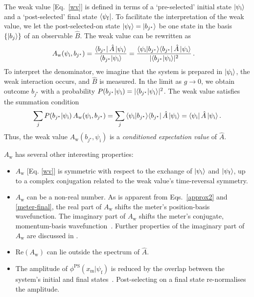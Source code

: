 \documentclass[%
 reprint,
superscriptaddress,
nofootinbib,
bibnotes,
 amsmath,amssymb,
 aps,
]{revtex4-1}
\theoremstyle{plain}
\begin{document}
The weak value [Eq.~\eqref{wv}] is defined in terms of a `pre-selected' initial state $\ket{\psi_{\mathrm{i}}}$ and a `post-selected' final state $\bra{\psi_{\mathrm{f}}}$. 
To facilitate the interpretation of the weak value, we let the post-selected-on state $\ket{\psi_{\mathrm{f}}} = \ket{b_{j^{\star}}}$ be one state in the basis $\{\ket{b_j}\}$ of an observable $\hat{B}$. The weak value can  be rewritten as
\begin{align}
    \label{eq_weakhelp1}
    A_{\mathrm{w}}(\psi_{\mathrm{i}},b_{j^{\star}}) &= \frac{\bra{b_{j^{\star}}}\hat{A}\ket{\psi_{\mathrm{i}}}}{\braket{b_{j^{\star}}|\psi_{\mathrm{i}}}} = \frac{\braket{\psi_{\mathrm{i}}|b_{j^{\star}}}\!\bra{b_{j^{\star}}}\hat{A}\ket{\psi_{\mathrm{i}}}}{|\!\braket{b_{j^{\star}}|\psi_{\mathrm{i}}}\!|^2} \, .
\end{align}
To interpret the denominator, we imagine that the system is prepared in $\ket{\psi_{\mathrm{i}}}$, the weak interaction occurs, and $\hat{B}$ is measured. In the limit as $g \rightarrow 0$, we obtain outcome $b_{j^{\star}}$ with a probability $P(b_{j^{\star}}|\psi_{\mathrm{i}}) = |\!\braket{b_{j^{\star}}|\psi_{\mathrm{i}}}\!|^2$.
The weak value satisfies the summation condition
\begin{align}
    \sum_j P(b_{j^{\star}} |\psi_{\mathrm{i}})\,A_{\mathrm{w}}(\psi_{\mathrm{i}},b_{j^{\star}}) = \sum_j \braket{\psi_{\mathrm{i}}|b_{j^{\star}}}\!\bra{b_{j^{\star}}}\hat{A}\ket{\psi_{\mathrm{i}}} = \bra{\psi_{\mathrm{i}}}\hat{A}\ket{\psi_{\mathrm{i}}}.
\end{align}
Thus, the weak value $A_{\mathrm{w}}(b_{j^{\star}},\psi_{\mathrm{i}})$ is a  \emph{conditioned expectation value} of $\hat{A}$. 

$A_{\mathrm{w}}$  has several other interesting properties:  
\begin{itemize}

\item $A_{\mathrm{w}}$ [Eq.  \eqref{wv}] is symmetric with respect to the exchange of $\ket{\psi_{\mathrm{i}}}$ and $\ket{\psi_{\mathrm{f}}}$, 
up to a complex conjugation related to the weak value's time-reversal symmetry.

\item $A_{\mathrm{w}}$ can be a non-real number. As is apparent from Eqs.~\eqref{approx2} and \eqref{meter-final}, the real part of $A_{\mathrm{w}}$ shifts the meter's position-basis wavefunction.
The imaginary part of $A_{\mathrm{w}}$ shifts the meter's conjugate, momentum-basis wavefunction~\cite{Dressel12-2}.  Further properties of the imaginary part of $A_{\mathrm{w}}$ are discussed in \cite{Budiyono_2023_as,Budiyono_PRA_23}.

\item $\text{Re}(A_{\mathrm{w}})$ can lie outside the 
spectrum of $\hat{A}$.

\item The  amplitude of $\phi^{\mathrm{PS}}(x_{\mathrm{m}}|\psi_{\mathrm{f}})$ is reduced by the overlap between the system's initial and final states~\cite{Jordan23}. 
Post-selecting on a final state re-normalises the amplitude.
\end{itemize}
\end{document}
